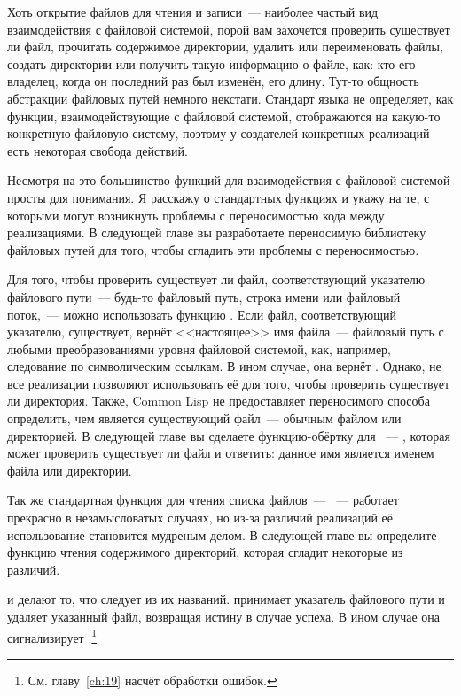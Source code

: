 Хоть открытие файлов для чтения и записи~--- наиболее частый вид взаимодействия с файловой
системой, порой вам захочется проверить существует ли файл, прочитать содержимое
директории, удалить или переименовать файлы, создать директории или получить такую
информацию о файле, как: кто его владелец, когда он последний раз был изменён, его
длину. Тут-то общность абстракции файловых путей немного некстати. Стандарт языка не
определяет, как функции, взаимодействующие с файловой системой, отображаются на какую-то
конкретную файловую систему, поэтому у создателей конкретных реализаций есть некоторая
свобода действий.

Несмотря на это большинство функций для взаимодействия с файловой системой просты для
понимания. Я расскажу о стандартных функциях и укажу на те, с которыми могут возникнуть
проблемы с переносимостью кода между реализациями. В следующей главе вы разработаете
переносимую библиотеку файловых путей для того, чтобы сгладить эти проблемы с
переносимостью.

Для того, чтобы проверить существует ли файл, соответствующий указателю файлового пути~---
будь-то файловый путь, строка имени или файловый поток,~--- можно использовать функцию
. Если файл, соответствующий указателю, существует, 
вернёт <<настоящее>> имя файла~--- файловый путь с любыми преобразованиями уровня файловой
системой, как, например, следование по символическим ссылкам. В ином случае, она вернёт
. Однако, не все реализации позволяют использовать её для того, чтобы проверить
существует ли директория. Также, Common Lisp не предоставляет переносимого способа
определить, чем является существующий файл~--- обычным файлом или директорией. В следующей
главе вы сделаете функцию-обёртку для ~--- , которая
может проверить существует ли файл и ответить: данное имя является именем файла или
директории.

Так же стандартная функция для чтения списка файлов~--- ~--- работает
прекрасно в незамысловатых случаях, но из-за различий реализаций её использование
становится мудреным делом. В следующей главе вы определите функцию чтения содержимого
директорий, которая сгладит некоторые из различий.

 и  делают то, что следует из их
названий.  принимает указатель файлового пути и удаляет указанный файл,
возвращая истину в случае успеха. В ином случае она сигнализирует
.\footnote{См. главу~\ref{ch:19} насчёт обработки ошибок.}

